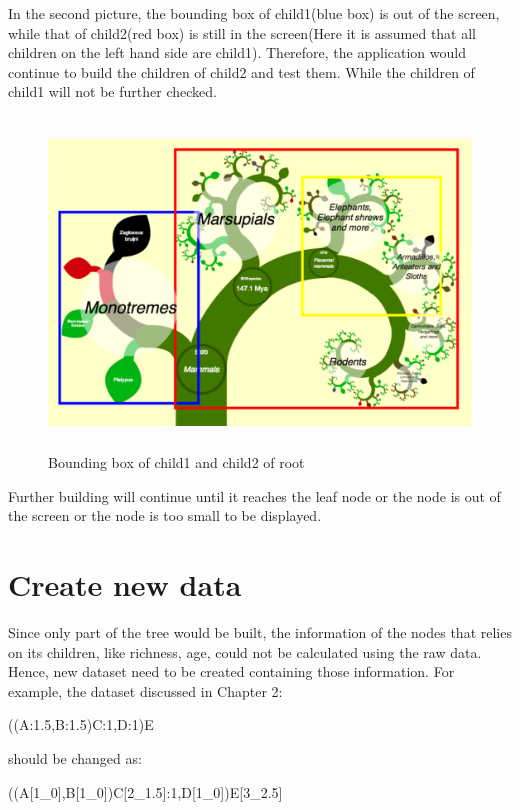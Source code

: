 \documentclass[MSc]{icldt}
\begin{document}
In the second picture, the bounding box of child1(blue box) is out of the screen, while that of child2(red box) is still in the screen(Here it is assumed that all children on the left hand side are child1). Therefore, the application would continue to build the children of child2 and test them. While the children of child1 will not be further checked. 

\begin{figure}[H]
  \centering
  \includegraphics [width=15cm,height=8.8cm]{ScreenAndBounding2}
  \caption{Bounding box of child1 and child2 of root}
  \label{fig:mammal}
\end{figure}

Further building will continue until it reaches the leaf node or the node is out of the screen or the node is too small to be displayed.



\section{Create new data}

Since only part of the tree would be built, the information of the nodes that relies on its children, like richness, age, could not be calculated using the raw data. Hence, new dataset need to be created containing those information. For example, the dataset discussed in Chapter 2: 

\begin{center}
	((A:1.5,B:1.5)C:1,D:1)E
\end{center}

should be changed as:

\begin{center}
	((A[1\_0],B[1\_0])C[2\_1.5]:1,D[1\_0])E[3\_2.5]
\end{center}
\end{document}
